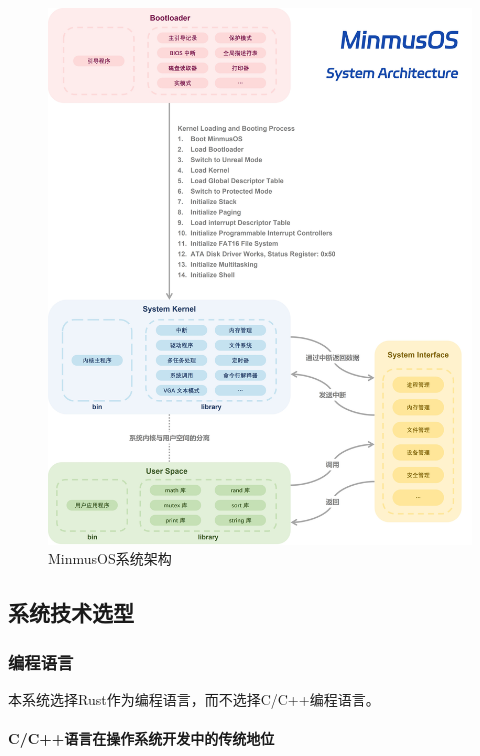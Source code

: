 \begin{figure}[htbp]
    \centering
    \includegraphics[width=\textwidth]{figures/SystemArchitecture.png}
    \caption{MinmusOS系统架构}
    \label{fig:SystemArchitecture}
\end{figure}

\subsection{系统技术选型}\label{sec:SystemTechnicalSelection}

\subsubsection{编程语言}

本系统选择Rust作为编程语言，而不选择C/C++编程语言。

\paragraph{C/C++语言在操作系统开发中的传统地位}


